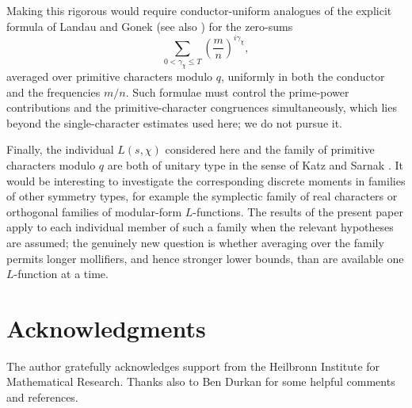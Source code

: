 \documentclass[12pt,a4paper,reqno]{amsart}
\theoremstyle{remark}
\numberwithin{equation}{section}
\begin{document}
Making this rigorous would require conductor-uniform analogues of the explicit formula of Landau \cite{Landau} and Gonek \cite{GonekLandau,GonekMean} (see also \cite{DHPC}) for the zero-sums
\[
\sum_{0<\gamma_\chi\le T}\left(\frac{m}{n}\right)^{i\gamma_\chi},
\]
averaged over primitive characters modulo $q$, uniformly in both the conductor and the frequencies $m/n$. Such formulae must control the prime-power contributions and the primitive-character congruences simultaneously, which lies beyond the single-character estimates used here; we do not pursue it.

Finally, the individual $L(s,\chi)$ considered here and the family of primitive characters modulo $q$ are both of unitary type in the sense of Katz and Sarnak \cite{KatzSarnak}. It would be interesting to investigate the corresponding discrete moments in families of other symmetry types, for example the symplectic family of real characters or orthogonal families of modular-form $L$-functions. The results of the present paper apply to each individual member of such a family when the relevant hypotheses are assumed; the genuinely new question is whether averaging over the family permits longer mollifiers, and hence stronger lower bounds, than are available one $L$-function at a time.

\section*{Acknowledgments}
The author gratefully acknowledges support from the Heilbronn Institute for Mathematical Research. Thanks also to Ben Durkan for some helpful comments and references.
\end{document}
